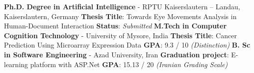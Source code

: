 %
%
%

\vspace{1em}

\begin{scholarship}
	{
		\textbf{Ph.D. Degree in Artificial Intelligence} - RPTU Kaiserslautern -- Landau, Kaiserslautern, Germany \newline
		\textbf{Thesis Title}: Towards Eye Movements Analysis in Human-Document Interaction \newline
		\textbf{Status}: \textit{Submitted} \newline
	}
	{
		\textbf{M.Tech in Computer Cognition Technology} - University of Mysore, India \newline
		\textbf{Thesis Title}: Cancer Prediction Using Microarray Expression Data \newline
		\textbf{GPA}: 9.3 / 10 \textit{(Distinction) }\newline
	}
	{
		\textbf{B. Sc in Software Engineering} - Azad University, Iran \newline
		\textbf{Graduation project}: E-learning platform with ASP.Net \newline
		\textbf{GPA}: 15.13 / 20 \textit{(Iranian Grading Scale)}  \newline
	}
\end{scholarship}